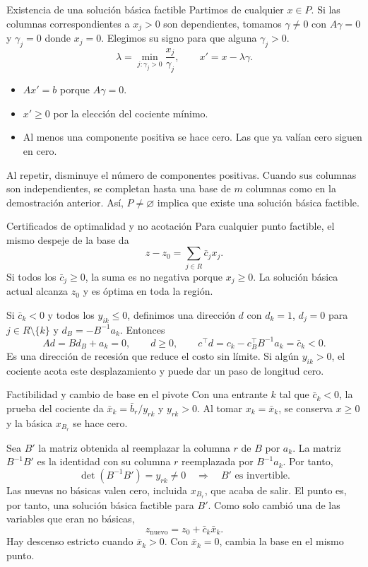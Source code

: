 \documentclass[aspectratio=169,12pt]{beamer}
\begin{document}
\begin{frame}{Existencia de una solución básica factible}
Partimos de cualquier $x\in P$. Si las columnas correspondientes a
$x_j>0$ son dependientes, tomamos $\gamma\ne0$ con $A\gamma=0$ y
$\gamma_j=0$ donde $x_j=0$. Elegimos su signo para que alguna
$\gamma_j>0$.
\[
 \lambda=\min_{j:\gamma_j>0}\frac{x_j}{\gamma_j},\qquad
 x'=x-\lambda\gamma .
\]
\begin{itemize}
\item $Ax'=b$ porque $A\gamma=0$.
\item $x'\ge0$ por la elección del cociente mínimo.
\item Al menos una componente positiva se hace cero. Las que ya
      valían cero siguen en cero.
\end{itemize}
\medskip

Al repetir, disminuye el número de componentes positivas. Cuando sus
columnas son independientes, se completan hasta una base de $m$ columnas
como en la demostración anterior. Así, $P\ne\varnothing$ implica que existe
una solución básica factible.
\end{frame}

\begin{frame}[label=teoria-certificados]{Certificados de optimalidad y no acotación}
Para cualquier punto factible, el mismo despeje de la base da
\[
 z-z_0=\sum_{j\in R}\bar c_j x_j.
\]
Si todos los $\bar c_j\ge0$, la suma es no negativa porque $x_j\ge0$.
La solución básica actual alcanza $z_0$ y es óptima en toda la región.
\medskip

Si $\bar c_k<0$ y todos los $y_{ik}\le0$, definimos una dirección $d$
con $d_k=1$, $d_j=0$ para $j\in R\setminus\{k\}$ y
$d_B=-B^{-1}a_k$. Entonces
\[
 Ad=Bd_B+a_k=0,\qquad d\ge0,\qquad
 c^\top d=c_k-c_B^\top B^{-1}a_k=\bar c_k<0.
\]
Es una dirección de recesión que reduce el costo sin límite.
Si algún $y_{ik}>0$, el cociente acota este desplazamiento y puede dar
un paso de longitud cero.
\end{frame}

\begin{frame}[label=teoria-pivote]{Factibilidad y cambio de base en el pivote}
Con una entrante $k$ tal que $\bar c_k<0$, la prueba del cociente
da $\bar x_k=\bar b_r/y_{rk}$ y $y_{rk}>0$. Al tomar $x_k=\bar x_k$,
se conserva $x\ge0$ y la básica $x_{B_r}$ se hace cero.
\medskip

Sea $B'$ la matriz obtenida al reemplazar la columna $r$ de $B$
por $a_k$. La matriz $B^{-1}B'$ es la identidad con su columna $r$
reemplazada por $B^{-1}a_k$. Por tanto,
\[
 \det(B^{-1}B')=y_{rk}\ne0
 \quad\Longrightarrow\quad B' \text{ es invertible}.
\]
Las nuevas no básicas valen cero, incluida $x_{B_r}$, que acaba de salir.
El punto es, por tanto, una solución básica factible para $B'$.
Como solo cambió una de las variables que eran no básicas,
\[
 z_{\mathrm{nuevo}}=z_0+\bar c_k\bar x_k .
\]
Hay descenso estricto cuando $\bar x_k>0$. Con $\bar x_k=0$,
cambia la base en el mismo punto.
\end{frame}
\end{document}
